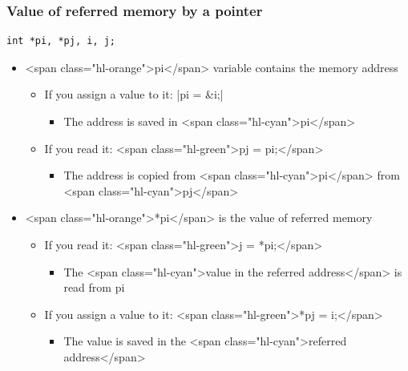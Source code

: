 \documentclass{../c-lecture}
\begin{document}
\begin{frame}[fragile]
  \frametitle{Value of referred memory by a pointer}
  \begin{verbatim}
int *pi, *pj, i, j;
  \end{verbatim}
  \begin{itemize}
    \item
      <span class="hl-orange">pi</span> variable contains the memory address

    \begin{itemize}
      \item
        If you assign a value to it:
        |pi = &i;|

      \begin{itemize}
        \item The address is saved in <span class="hl-cyan">pi</span>
      \end{itemize}
      \item If you read it: <span class="hl-green">pj = pi;</span>
      \begin{itemize}
        \item
          The address is copied from <span class="hl-cyan">pi</span> from
          <span class="hl-cyan">pj</span>

      \end{itemize}
    \end{itemize}
  \end{itemize}
\end{frame}
\begin{frame}
  \begin{itemize}
    \item
      <span class="hl-orange">*pi</span> is the value of referred memory

    \begin{itemize}
      \item If you read it: <span class="hl-green">j = *pi;</span>
      \begin{itemize}
        \item
          The <span class="hl-cyan">value in the referred address</span> is
          read from pi

      \end{itemize}
      \item
        If you assign a value to it: <span class="hl-green">*pj = i;</span>

      \begin{itemize}
        \item
          The value is saved in the
          <span class="hl-cyan">referred address</span>

      \end{itemize}
    \end{itemize}
  \end{itemize}
\end{frame}
\end{document}
